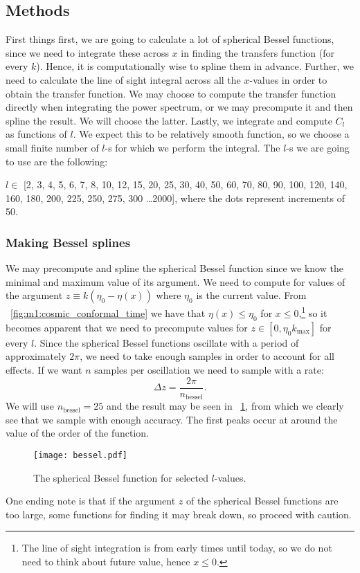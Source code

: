 \subsection{Methods}\label{sec:m4:methods}
    First things first, we are going to calculate a lot of spherical Bessel functions, since we need to integrate these across $x$ in finding the transfers function (for every $k$). Hence, it is computationally wise to spline them in advance. Further, we need to calculate the line of sight integral across all the $x$-values in order to obtain the transfer function. We may choose to compute the transfer function directly when integrating the power spectrum, or we may precompute it and then spline the result. We will choose the latter. Lastly, we integrate and compute $C_l$ as functions of $l$. We expect this to be relatively smooth function, so we choose a small finite number of $l$-s for which we perform the integral. 
    The $l$-s we are going to use are the following:

    $l\in$ [2,    3,    4,    5,    6,    7,    8,    10,   12,   15,   
    20,   25,   30,   40,   50,   60,   70,   80,   90,   100,  
    120,  140,  160,  180,  200,  225,  250,  275,  300 \dots 2000],
    where the dots represent increments of 50. 
    \subsubsection{Making Bessel splines}
        We may precompute and spline the spherical Bessel function since we know the minimal and maximum value of its argument. We need to compute for values of the argument $z\equiv k(\eta_0-\eta(x))$ where $\eta_0$ is the current value. From ~\cref{fig:m1:cosmic_conformal_time} we have that $\eta(x) \leq \eta_0$ for $x\leq0$,\footnote{The line of sight integration is from early times until today, so we do not need to think about future value, hence $x\leq0$.} so it becomes apparent that we need to precompute values for $z\in[0, \eta_0k_\mathrm{max}]$ for every $l$. Since the spherical Bessel functions oscillate with a period of approximately $2\pi$, we need to take enough samples in order to account for all effects. If we want $n$ samples per oscillation we need to sample with a rate:
        \begin{equation}\label{eq:m4:methods:bessel_sampling}
            \Delta z = \frac{2\pi}{n_\mathrm{bessel}}.
        \end{equation}
        We will use $n_\mathrm{bessel}=25$ and the result may be seen in ~\cref{fig:m4:bessel}, from which we clearly see that we sample with enough accuracy. The first peaks occur at around the value of the order of the function. 
        \begin{figure}
            \texttt{[image: bessel.pdf]}
            \caption{The spherical Bessel function for selected $l$-values.}
            \label{fig:m4:bessel}
        \end{figure}
        One ending note is that if the argument $z$ of the spherical Bessel functions are too large, some functions for finding it may break down, so proceed with caution. 

